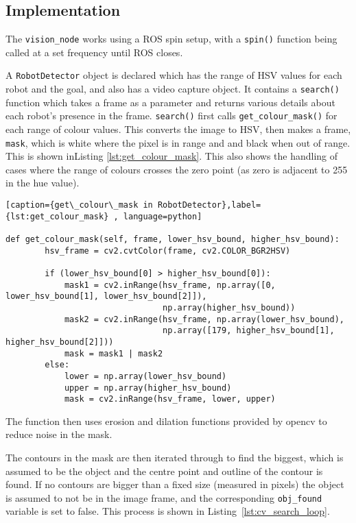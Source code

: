 \subsection{Implementation}\label{soft/cv/impl}
The \verb|vision_node| works using a ROS spin setup, with a \verb|spin()| function being
called at a set frequency until ROS closes.

A \verb|RobotDetector| object is declared which has the range of HSV values for each robot
and the goal, and also has a video capture object. It contains a \verb|search()| function which
takes a frame as a parameter and returns various details about each robot's presence in the
frame. \verb|search()| first calls \verb|get_colour_mask()| for each range of colour
values. This converts the image to HSV, then makes a frame, \verb|mask|, which is white where
the pixel is in range and and black when out of range. This is shown inListing
\ref{lst:get_colour_mask}. This also shows the handling of cases where the range of colours
crosses the zero point (as zero is adjacent to 255 in the hue value).

\begin{lstlisting}[caption={get\_colour\_mask in RobotDetector},label={lst:get_colour_mask} , language=python]

def get_colour_mask(self, frame, lower_hsv_bound, higher_hsv_bound):
        hsv_frame = cv2.cvtColor(frame, cv2.COLOR_BGR2HSV)

        if (lower_hsv_bound[0] > higher_hsv_bound[0]):
            mask1 = cv2.inRange(hsv_frame, np.array([0, lower_hsv_bound[1], lower_hsv_bound[2]]),
                                np.array(higher_hsv_bound))
            mask2 = cv2.inRange(hsv_frame, np.array(lower_hsv_bound),
                                np.array([179, higher_hsv_bound[1], higher_hsv_bound[2]]))
            mask = mask1 | mask2
        else:
            lower = np.array(lower_hsv_bound)
            upper = np.array(higher_hsv_bound)
            mask = cv2.inRange(hsv_frame, lower, upper)

\end{lstlisting}

The function then uses erosion and dilation functions provided by opencv to reduce noise in the
mask.

The contours in the mask are then iterated through to find the biggest, which is assumed to be
the object and the centre point and outline of the contour is found. If no contours are bigger
than a fixed size (measured in pixels) the object is assumed to not be in the image frame, and
the corresponding \verb|obj_found| variable is set to false. This process is shown in Listing~\ref{lst:cv_search_loop}.

